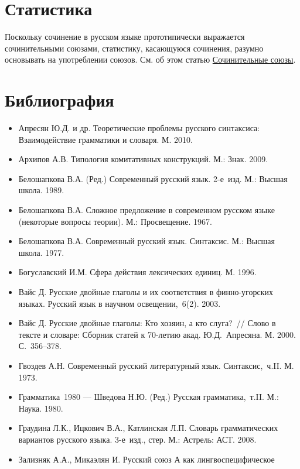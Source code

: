 \section{Статистика}\label{ux441ux442ux430ux442ux438ux441ux442ux438ux43aux430}

Поскольку сочинение в русском языке прототипически выражается
сочинительными союзами, статистику, касающуюся сочинения, разумно
основывать на употреблении союзов. См. об этом статью
\underline{Сочинительные союзы}.

\section*{Библиография}\label{ux431ux438ux431ux43bux438ux43eux433ux440ux430ux444ux438ux44f}

\begin{itemize}
\item
  Апресян Ю.Д. и др. Теоретические проблемы русского синтаксиса:
  Взаимодействие грамматики и словаря. М. 2010.
\item
  Архипов А.В. Типология комитативных конструкций. М.: Знак. 2009.
\item
  Белошапкова В.А. (Ред.) Современный русский язык. 2-е~изд. М.: Высшая
  школа. 1989.
\item
  Белошапкова В.А. Сложное предложение в современном русском языке
  (некоторые вопросы теории). М.: Просвещение. 1967.
\item
  Белошапкова В.А. Современный русский язык. Синтаксис. М.: Высшая
  школа. 1977.
\item
  Богуславский И.М. Сфера действия лексических единиц. М. 1996.
\item
  Вайс Д. Русские двойные глаголы и их соответствия в финно-угорских
  языках. Русский язык в научном освещении,~6(2). 2003.
\item
  Вайс Д. Русские двойные глаголы: Кто хозяин, а кто слуга?~// Слово в
  тексте и словаре: Сборник статей к 70-летию акад. Ю.Д.~Апресяна. М.
  2000. С.~356--378.
\item
  Гвоздев А.Н. Современный русский литературный язык. Синтаксис,~ч.II.
  М. 1973.
\item
  Грамматика~1980 --- Шведова Н.Ю. (Ред.) Русская грамматика,~т.II. М.:
  Наука. 1980.
\item
  Граудина Л.К., Ицкович В.А., Катлинская Л.П. Словарь грамматических
  вариантов русского языка. 3-е~изд., стер. М.: Астрель: АСТ. 2008.
\item
  Зализняк А.А., Микаэлян И. Русский союз А как лингвоспецифическое

\end{itemize}
